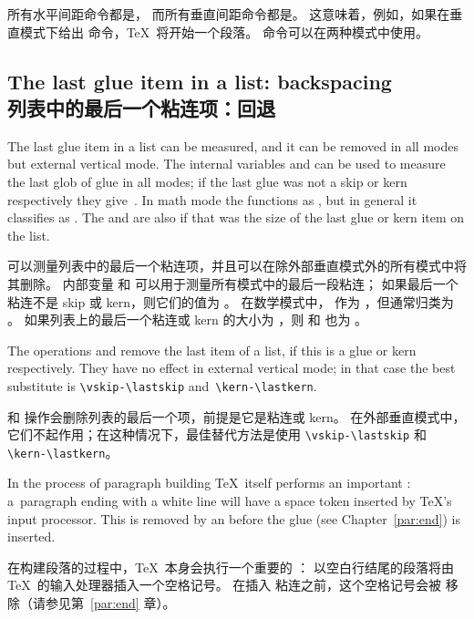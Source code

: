 所有水平间距命令都是，
而所有垂直间距命令都是。
这意味着，例如，如果在垂直模式下给出  命令，\TeX\ 将开始一个段落。
 命令可以在两种模式中使用。
\subsection{The last  glue item in a list: backspacing\\列表中的最后一个粘连项：回退}

The last glue item in a list can be measured, and
it can be removed in all modes but external vertical mode.
The internal variables
 and   can be used
to measure the last glob of glue in all modes;
if the last glue was not a skip or kern respectively
they give~\n{0pt}.
In math mode the 
functions as , but in general
it classifies as .
The  and 
are also \n{0pt} if that was the size of the last glue or
kern item on the list.

可以测量列表中的最后一个粘连项，并且可以在除外部垂直模式外的所有模式中将其删除。
内部变量  和  可以用于测量所有模式中的最后一段粘连；
如果最后一个粘连不是 skip 或 kern，则它们的值为 \n{0pt}。
在数学模式中， 作为 ，但通常归类为 。
如果列表上的最后一个粘连或 kern 的大小为 \n{0pt}，则  和  也为 \n{0pt}。

The operations\label{unskip}
 and  remove the last item of a list,
if this is a glue or kern respectively. They have no effect
in external vertical mode; in that case the
best substitute is 
\verb=\vskip-\lastskip= 
and~\verb=\kern-\lastkern=.

 和  操作会删除列表的最后一个项，前提是它是粘连或 kern。
在外部垂直模式中，它们不起作用；在这种情况下，最佳替代方法是使用 \verb=\vskip-\lastskip= 和 \verb=\kern-\lastkern=。

In the process of paragraph building \TeX\ itself performs
an important : a~paragraph ending with a
white line will have a space token inserted by \TeX's input processor.
This is removed by an  before the  glue
(see Chapter~\ref{par:end}) is inserted.

在构建段落的过程中，\TeX\ 本身会执行一个重要的 ：
以空白行结尾的段落将由 \TeX\ 的输入处理器插入一个空格记号。
在插入  粘连之前，这个空格记号会被  移除（请参见第~\ref{par:end} 章）。

